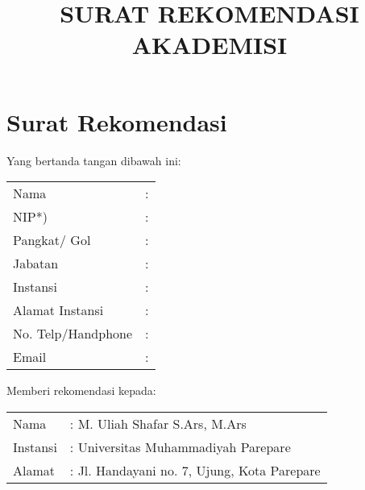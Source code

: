 \documentclass[12pt]{article}
\title{\vspace{-4ex}SURAT REKOMENDASI AKADEMISI}
\author{}
\date{\vspace{-6ex}}
\begin{document}
\begin{comment}

\flushleft{Perihal Permohonan Lamaran Kerja\\ Staff Pengajar/Dosen}


\vspace{\baselineskip}%
{\raggedleft
\begin{tabular}{p{1cm}l@{}}
\vspace{10pt}
&Parepare, \today\\
& Kepada\\
Yth. & Bapak Rektor\\
&Universitas Muhammadiyah\\
&di \\
&Parepare

\end{tabular}\par}

\end{comment}

\section{Surat Rekomendasi}

Yang bertanda tangan dibawah ini:

\begin{table}[htpb]
\renewcommand{\arraystretch}{1.5}
    \begin{tabular}{p{4cm}l}
Nama & :  \\
NIP*) & : \\
Pangkat/ Gol & : \\
Jabatan & : \\
Instansi & : \\
Alamat Instansi & : \\
No. Telp/Handphone &: \\
Email & : \\
    \end{tabular}
\end{table}
\vspace{-4mm}
Memberi rekomendasi kepada:
\begin{table}[htpb]
    \begin{tabular}{p{4cm}l}
Nama & : M. Uliah Shafar S.Ars, M.Ars\\
Instansi & : Universitas Muhammadiyah Parepare \\
Alamat & : Jl. Handayani no. 7, Ujung, Kota Parepare \\
    \end{tabular}
\end{table}
\vspace{-4mm}
\end{document}
